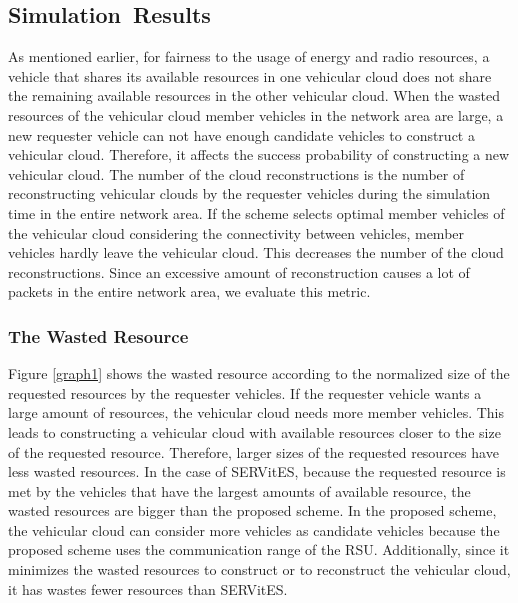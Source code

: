 \documentclass[electronics,aricle,accept,pdftex,moreauthors]{Definitions/mdpi}
\begin{document}
\subsection{Simulation~Results}\label{sec5.2}
As mentioned earlier, for fairness to the usage of energy and radio resources, a vehicle that shares its available resources in one vehicular cloud does not share the remaining available resources in the other vehicular cloud.
When the wasted resources of the vehicular cloud member vehicles in the network area are large, a new requester vehicle can not have enough candidate vehicles to construct a vehicular cloud.
Therefore, it affects the success probability of constructing a new vehicular cloud.
The number of the cloud reconstructions is the number of reconstructing vehicular clouds by the requester vehicles during the simulation time in the entire network area.
If the scheme selects optimal member vehicles of the vehicular cloud considering the connectivity between vehicles, member vehicles hardly leave the vehicular cloud.
This decreases the number of the cloud reconstructions.
Since an excessive amount of reconstruction causes a lot of packets in the entire network area, we evaluate this metric.

\subsubsection{The Wasted Resource} \label{sec5.2.1}

Figure \ref{graph1} shows the wasted resource according to the normalized size of the requested resources by the requester vehicles.
If the requester vehicle wants a large amount of resources, the vehicular cloud needs more member vehicles.
This leads to constructing a vehicular cloud with available resources closer to the size of the requested resource.
Therefore, larger sizes of the requested resources have less wasted resources.
In the case of SERVitES, because the requested resource is met by the vehicles that have the largest amounts of available resource, the wasted resources are bigger than the proposed scheme.
In the proposed scheme, the vehicular cloud can consider more vehicles as candidate vehicles because the proposed scheme uses the communication range of the RSU.
Additionally, since it minimizes the wasted resources to construct or to reconstruct the vehicular cloud, it has wastes fewer resources than SERVitES.
\end{document}
